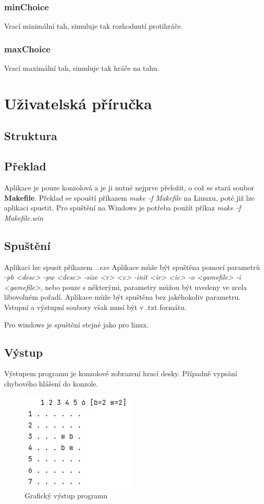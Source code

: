 \documentclass[
12pt,
a4paper,
pdftex,
czech,
titlepage
]{report}
\begin{document}
\subsection{minChoice}
Vrací minimální tah, simuluje tak rozhodnutí protihráče.
\subsection{maxChoice}
Vrací maximální tah, simuluje tak hráče na tahu.

\chapter{Uživatelská příručka}

\section{Struktura}
\section{Překlad}
Aplikace je pouze konzolová a je ji nutné nejprve přeložit, o což se stará soubor \textbf{Makefile}. Překlad se spouští příkazem \textit{make -f Makefile} na Linuxu, poté již lze aplikaci spustit. Pro spuštění na Windows je potřeba použít příkaz \textit{make -f Makefile.win}

\section{Spuštění}
Aplikaci lze spusit příkazem  \textit{.\othello.exe} Aplikace může být spuštěna pomocí parametrů \textit{-pb <desc> -pw <desc> -size <r> <c> -init <ir> <ic> -o <gamefile> -i <gamefile>}, nebo pouze s některými, parametry můžou být uvedeny ve zcela libovolném pořadí. Aplikace může být spuštěna bez jakéhokoliv parametru. Vstupní a výstupní soubory však musí být v .txt formátu.

Pro windows je spuštění stejné jako pro linux.

\section{Výstup}
Výstupem programu je konzolové zobrazení hrací desky. Případně vypsání chybového hlášení do konzole.
\begin{figure}[ht]
    \centering
    \includegraphics[width=0.4\linewidth]{othello.png}
    \caption{Grafický výstup programu}
    \label{fig:enter-label}
\end{figure}
\end{document}
